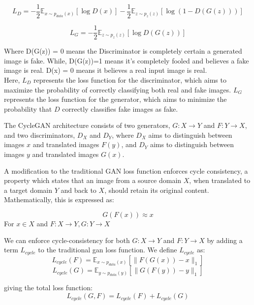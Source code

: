 \documentclass[12pt]{article}
\begin{document}
\begin{equation}
L_D = -\frac{1}{2}\mathbb{E}_{x\sim p_{data}(x)}[\log D(x)] - \frac{1}{2}\mathbb{E}_{z\sim p_z(z)}[\log(1 - D(G(z)))]
\end{equation}

\begin{equation}
L_G = -\frac{1}{2}\mathbb{E}_{z\sim p_z(z)}[\log D(G(z))]
\end{equation}

Where D(G(z)) = 0 means the Discriminator is completely certain a generated image is fake. While, D(G(z))=1 means it's completely fooled and believes a fake image is real. D(x) = 0 means it believes a real input image is real. \\

Here, \(L_D\) represents the loss function for the discriminator, which aims to maximize the probability of correctly classifying both real and fake images. \(L_G\) represents the loss function for the generator, which aims to minimize the probability that \(D\) correctly classifies fake images as fake.

The CycleGAN architecture consists of two generators, \(G: X \rightarrow Y\) and \(F: Y \rightarrow X\), and two discriminators, \(D_X\) and \(D_Y\), where \(D_X\) aims to distinguish between images \(x\) and translated images \(F(y)\), and \(D_Y\) aims to distinguish between images \(y\) and translated images \(G(x)\). 



A modification to the traditional GAN loss function enforces cycle consistency, a property which states that an image from a source domain \(X\), when translated to a target domain \(Y\) and back to \(X\), should retain its original content. Mathematically, this is expressed as:

\begin{equation}
G(F(x)) \approx x
\end{equation}
For \(x \in X\) and \(F: X \rightarrow Y, G: Y\rightarrow X\)

We can enforce cycle-consistency for both \(G: X \rightarrow Y\) and \(F: Y \rightarrow X\) by adding a term \(L_{cycle}\) to the traditional gan loss function. We define \(L_{cycle}\) as:
\[L_{cycle}(F) = \mathbb{E}_{x \sim p_{data}(x)}[\|F(G(x)) - x\|_1]\]
\[L_{cycle}(G) = \mathbb{E}_{y \sim p_{data}(y)}[\|G(F(y)) - y\|_1]\]

giving the total loss function:
\begin{equation}
L_{cycle}(G, F) = L_{cycle}(F) + L_{cycle}(G)
\end{equation}
\end{document}
